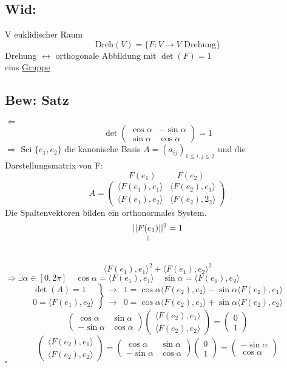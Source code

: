 \documentclass[titlepage,12pt,a4paper,ngerman]{report}
\newenvironment{bew}[1]{\subsection{Bew: #1}}{\hfill$\square$}
\newcommand{\Bew}[2]{\begin{bew}{#1}#2\end{bew}}
\newcommand{\verteq}{\rotatebox{90}{$\,=$}}
\newcommand{\equalto}[2]{\underset{\scriptstyle\overset{\mkern4mu\verteq}{#2}}{#1}}
\newcommand{\tx}[1]{\textrm{#1}}
\newcommand{\ska}[2]{\langle #1 , #2 \rangle}
\begin{document}

\subsection{Wid:}
V  euklidischer Raum
$$\tx{Dreh}(V) = \{F: V \to V \tx{ Drehung}\}$$
Drehung $ \leftrightarrow $ orthogonale Abbildung mit $ \det(F) = 1 $\\
eins \underline{Gruppe}

\Bew{Satz}{
$\boxed{ \Leftarrow }$
$$\det \begin{pmatrix}
\cos \alpha & - \sin \alpha\\
\sin \alpha & \cos \alpha
\end{pmatrix} = 1$$
$\boxed{\Rightarrow}$ Sei $ \{e_1,e_2\} $ die kanonische Basis $ A = (a_{ij})_{1 \le i,j \le 2} $ und die Darstellungsmatrix von F:
$$\phantom{A = } F(e_1) \qquad \ \  F(e_2)$$
$$A = \begin{pmatrix}
\ska{F(e_1)}{e_1} & \ska{F(e_2)}{e_1}\\
\ska{F(e_1)}{e_2} & \ska{F(e_2)}{2_2}
\end{pmatrix}$$
Die Spaltenvektoren bilden ein orthonormales System.\pagebreak
$$||\equalto{F(e_1)}{}||^2 = 1$$\\[-30pt]
$$\ska{F(e_1)}{e_1}^2 + \ska{F(e_1)}{e_2}^2$$
$ \Rightarrow \exists \alpha \in [0,2 \pi] \quad \cos \alpha = \ska{F(e_1)}{e_1} \quad \sin \alpha = \ska{F(e_1)}{e_2} $
$$\left. \begin{array}{cc}
\det(A) = 1\\
0 = \ska{F(e_1)}{e_2}
\end{array}\right\} \begin{array}{cc}
\rightarrow & 1 = \cos \alpha \ska{F(e_2)}{e_2} - \sin \alpha \ska{F(e_2)}{e_1}\\
\rightarrow & 0 = \cos \alpha \ska{F(e_2)}{e_1} + \sin \alpha \ska{F(e_2)}{e_2}
\end{array}$$
$$\begin{pmatrix}
\cos \alpha & \sin \alpha\\
- \sin \alpha & \cos \alpha
\end{pmatrix} \begin{pmatrix}
\ska{F(e_2)}{e_1}\\
\ska{F(e_2)}{e_2}
\end{pmatrix} = \begin{pmatrix}
0\\1
\end{pmatrix}$$
$$\begin{pmatrix}
\ska{F(e_2)}{e_1}\\
\ska{F(e_2)}{e_2}
\end{pmatrix} = \begin{pmatrix}
\cos \alpha & \sin \alpha\\
- \sin \alpha & \cos \alpha
\end{pmatrix} \begin{pmatrix}
0\\1
\end{pmatrix} = \begin{pmatrix}
- \sin \alpha\\
\cos \alpha
\end{pmatrix}$$
}
\end{document}

